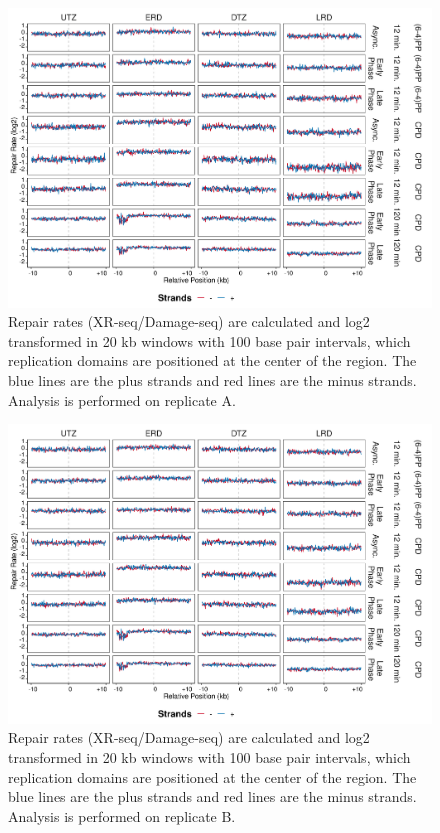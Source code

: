 \begin{figure}[H]
\begin{center}
\includegraphics[width=\textwidth]{Chapters/7_appendix/figures/supfig18}
\caption[Repair rates of replication domains in 20 kb (replicate A).]{Repair rates (XR-seq/Damage-seq) are calculated and log2 transformed in 20 kb windows with 100 base pair intervals, which replication domains are positioned at the center of the region. The blue lines are the plus strands and red lines are the minus strands. Analysis is performed on replicate A.}
\label{supfig:repairrate20repdomainA}
\end{center}
\end{figure}

\begin{figure}[H]
\begin{center}
\includegraphics[width=\textwidth]{Chapters/7_appendix/figures/supfig19}
\caption[Repair rates of replication domains in 20 kb (replicate B).]{Repair rates (XR-seq/Damage-seq) are calculated and log2 transformed in 20 kb windows with 100 base pair intervals, which replication domains are positioned at the center of the region. The blue lines are the plus strands and red lines are the minus strands. Analysis is performed on replicate B.}
\label{supfig:repairrate20repdomainB}
\end{center}
\end{figure}

